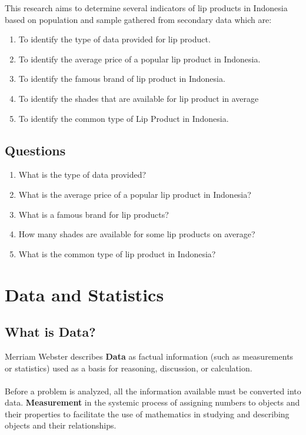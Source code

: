 \documentclass{article}
\begin{document}
        This research aims to determine several indicators of lip products in Indonesia based on population and sample gathered from    secondary data which are:
        \bigskip
    
        \begin{enumerate}
            \item To identify the type of data provided for lip product.
            \item To identify the average price of a popular lip product in Indonesia.
            \item To identify the famous brand of lip product in Indonesia.
            \item To identify the shades that are available for lip product in average
            \item To identify the common type of Lip Product in Indonesia.
        \end{enumerate}
    
        \subsection{Questions}
    
        \begin{enumerate}
            \item What is the type of data provided?
            \item What is the average price of a popular lip product in Indonesia?
            \item What is a famous brand for lip products?
            \item How many shades are available for some lip products on average?
            \item What is the common type of lip product in Indonesia?
        \end{enumerate}

    \section{Data and Statistics}

        \subsection{What is Data?}
        Merriam Webster describes \textbf{Data} as factual information (such as measurements or statistics) used as a basis for reasoning,  discussion, or calculation.
        \\ \\
        Before a problem is analyzed, all the information available must be converted into data. \textbf{Measurement} in the systemic process of assigning numbers to objects and their properties to facilitate the use of mathematics in studying and describing  objects and their relationships.
    
\end{document}
